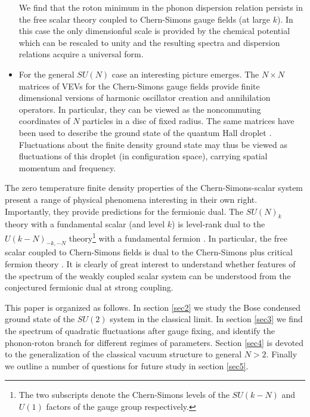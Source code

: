 \begin{itemize}
{ We find that the roton minimum in the phonon dispersion relation persists in the free scalar theory coupled to Chern-Simons gauge fields (at large $k$). In this case the only dimensionful scale is provided by the chemical potential which can be rescaled to unity and the resulting spectra and dispersion relations acquire a universal form.  }
 \item{For the general $SU(N)$ case an interesting picture emerges. The $N\times N$ matrices of VEVs for the Chern-Simons gauge fields provide  finite dimensional versions of harmonic oscillator  creation and annihilation operators. In particular, they can be viewed as the noncommuting coordinates of $N$ particles in a disc of fixed radius. The same matrices have been used to describe the ground state of the quantum Hall droplet \cite{hep-th/0103013, Susskind:2001fb}. Fluctuations about the finite density ground state  may thus be viewed as fluctuations of this droplet (in configuration space), carrying spatial momentum and frequency.}
  \end{itemize}
 The zero temperature finite density properties of the Chern-Simons-scalar system present a range of physical phenomena interesting in their own right. Importantly, they provide predictions for the fermionic dual.  The $SU(N)_k$  theory with a fundamental scalar (and level $k$) is level-rank dual to the $U(k-N)_{-k, -N}$ theory\footnote{The two subscripts denote the Chern-Simons levels of the $SU(k-N)$ and $U(1)$ factors of the gauge group respectively.} with a fundamental fermion \cite{1512.00161}. In particular, the free scalar coupled to Chern-Simons fields is dual to the Chern-Simons plus critical fermion theory \cite{Minwalla:2015sca}. It is clearly of great interest to understand whether features of the spectrum of the weakly coupled scalar system can be understood from the conjectured fermionic dual at strong coupling.
 
 This paper is organized as follows. In section \ref{sec2} we study the Bose condensed ground state of the $SU(2)$ system in the classical limit. In section \ref{sec3} we find the spectrum of quadratic fluctuations after gauge fixing, and identify the phonon-roton branch for different regimes of parameters. Section \ref{sec4} is devoted to the generalization of the classical vacuum structure to general $N>2$.  Finally we outline a number of questions for future study in section \ref{sec5}.
 
